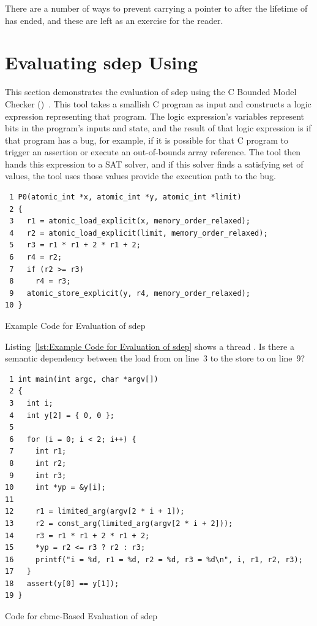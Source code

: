 \documentclass[10]{article}
\begin{document}
There are a number of ways to prevent carrying a pointer to  after
the lifetime of  has ended, and these are left as an exercise for
the reader.

\clearpage

\section{Evaluating sdep Using }
\label{sec:Evaluating sdep Using cbmc}

This section demonstrates the evaluation of sdep using
the C Bounded Model Checker
()~\cite{EdmundClarke2004CBMC}.
This tool takes a smallish C program as input and constructs a logic
expression representing that program.
The logic expression's variables represent bits in the program's inputs
and state, and the result of that logic expression is  if that
program has a bug, for example, if it is possible for that C program to
trigger an assertion or execute an out-of-bounds array reference.
The tool then hands this expression to a SAT solver, and if this solver
finds a satisfying set of values, the tool uses those values provide
the execution path to the bug.

\begin{listing}[tbp]
\scriptsize
\begin{verbatim}
 1 P0(atomic_int *x, atomic_int *y, atomic_int *limit)
 2 {
 3   r1 = atomic_load_explicit(x, memory_order_relaxed);
 4   r2 = atomic_load_explicit(limit, memory_order_relaxed);
 5   r3 = r1 * r1 + 2 * r1 + 2;
 6   r4 = r2;
 7   if (r2 >= r3)
 8     r4 = r3;
 9   atomic_store_explicit(y, r4, memory_order_relaxed);
10 }
\end{verbatim}
\caption{Example Code for Evaluation of sdep}
\label{lst:Example Code for Evaluation of sdep}
\end{listing}

Listing~\ref{lst:Example Code for Evaluation of sdep}
shows a  thread .
Is there a semantic dependency between the load from  on
line~3 to the store to  on line~9?

\begin{listing}[tbp]
\scriptsize
\begin{verbatim}
 1 int main(int argc, char *argv[])
 2 {
 3   int i;
 4   int y[2] = { 0, 0 };
 5
 6   for (i = 0; i < 2; i++) {
 7     int r1;
 8     int r2;
 9     int r3;
10     int *yp = &y[i];
11
12     r1 = limited_arg(argv[2 * i + 1]);
13     r2 = const_arg(limited_arg(argv[2 * i + 2]));
14     r3 = r1 * r1 + 2 * r1 + 2;
15     *yp = r2 <= r3 ? r2 : r3;
16     printf("i = %d, r1 = %d, r2 = %d, r3 = %d\n", i, r1, r2, r3);
17   }
18   assert(y[0] == y[1]);
19 }
\end{verbatim}
\caption{Code for cbmc-Based Evaluation of sdep}
\label{lst:Code for cbmc-Based Evaluation of sdep}
\end{listing}
\end{document}
